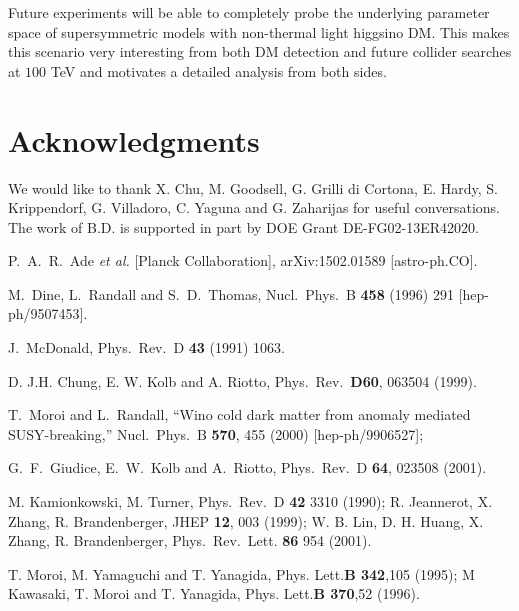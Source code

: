\documentclass[11pt,a4paper]{article}
\begin{document}
Future experiments will be able to completely probe the underlying parameter space of supersymmetric models with non-thermal light higgsino DM. This makes this scenario very interesting from both DM detection and future collider searches at $100$ TeV and motivates a detailed analysis from both sides.

\section*{Acknowledgments}

We would like to thank X. Chu, M. Goodsell, G. Grilli di Cortona, E. Hardy, S. Krippendorf, G. Villadoro, C. Yaguna and G. Zaharijas for useful conversations. The work of B.D. is supported in part by DOE Grant DE-FG02-13ER42020.

\begin{thebibliography}{9}
  

  P.~A.~R.~Ade {\it et al.} [Planck Collaboration],
  arXiv:1502.01589 [astro-ph.CO].


  M.~Dine, L.~Randall and S.~D.~Thomas,
  Nucl.\ Phys.\ B {\bf 458} (1996) 291
  [hep-ph/9507453].



  J.~McDonald,
  Phys.\ Rev.\ D {\bf 43} (1991) 1063.
  
  D. J.H. Chung, E. W. Kolb and A. Riotto, Phys.\ Rev.\
{\bf D60}, 063504 (1999).

  T.~Moroi and L.~Randall,
  ``Wino cold dark matter from anomaly mediated SUSY-breaking,''
  Nucl.\ Phys.\ B {\bf 570}, 455 (2000)
  [hep-ph/9906527];


  G.~F.~Giudice, E.~W.~Kolb and A.~Riotto,
   Phys.\ Rev.\ D {\bf 64}, 023508 (2001).


M. Kamionkowski, M. Turner,
Phys.\ Rev.\ D {\bf 42} 3310 (1990); 
R. Jeannerot, X. Zhang, R. Brandenberger, JHEP {\bf 12}, 003 (1999); 
W. B. Lin, D. H. Huang, X. Zhang, R. Brandenberger, Phys.\ Rev.\ Lett. {\bf 86} 954 (2001).

T. Moroi, M. Yamaguchi and T. Yanagida,
Phys. Lett.{\bf B 342},105 (1995); M Kawasaki, T. Moroi and
T. Yanagida, Phys. Lett.{\bf B 370},52 (1996).


\end{thebibliography}
\end{document}
